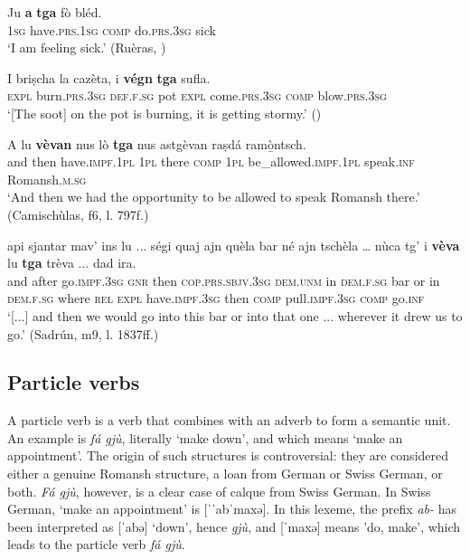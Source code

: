 \ea
\label{ex:vajtga1}
\gll  Ju \textbf{a} \textbf{tga} fò bléd.\\
\textsc{1sg} have.\textsc{prs.1sg} \textsc{comp} do.\textsc{prs.3sg} sick\\
\glt `I am feeling sick.' (Ruèras, )
\z

\ea
\label{ex:vegntga1}
\gll I briṣcha la cazèta, i \textbf{végn} \textbf{tga} sufla. \\
\textsc{expl} burn.\textsc{prs.3sg} \textsc{def.f.sg} pot \textsc{expl} come.\textsc{prs.3sg} \textsc{comp} blow.\textsc{prs.3sg} \\
\glt `[The soot] on the pot is burning, it is getting stormy.' ()
\z

\ea
\label{ex:vajtga2}
\gll    A lu \textbf{vèvan} nus lò \textbf{tga} nus astgèvan raṣdá ramò̱ntsch.\\
and then have.\textsc{impf.1pl} \textsc{1pl} there \textsc{comp} \textsc{1pl} be\_allowed.\textsc{impf.1pl} speak.\textsc{inf} Romansh.\textsc{m.sg} \\
\glt `And then we had the opportunity to be allowed to speak Romansh there.' (Camischùlas, f6, l. 797f.)
\z

\ea
\label{ex:vajtga3}
\gll  [...] api sjantar mav’ ins lu ... ségi quaj ajn quèla bar né ajn tschèla … nùca tg’ i \textbf{vèva} lu \textbf{tga} trèva ... dad ira.  \\
{} and after go.\textsc{impf.3sg} \textsc{gnr} then {} \textsc{cop.prs.sbjv.3sg} \textsc{dem.unm} in \textsc{dem.f.sg} bar or in \textsc{dem.f.sg} {} where \textsc{rel} \textsc{expl} have.\textsc{impf.3sg} then \textsc{comp} pull.\textsc{impf.3sg} {} \textsc{comp} go.\textsc{inf}\\
\glt `[...] and then we would go into this bar or into that one ... wherever it drew us to go.' (Sadrún, m9, l. 1837ff.)
\z

\subsection{Particle verbs}
A particle verb is a verb that combines with an adverb to form a semantic unit. An example is \textit{fá gjù}, literally `make down', and which means `make an appointment'. The origin of such structures is controversial: they are considered either a genuine Romansh structure, a loan from German or Swiss German, or both. \textit{Fá gjù}, however, is a clear case of calque from Swiss German. In Swiss German, `make an appointment' is [ˈˈabˈmaxə]. In this lexeme, the prefix \textit{ab-} has been interpreted as [ˈabə] `down', hence \textit{gjù}, and [ˈmaxə] means 'do, make', which leads to the particle verb \textit{fá gjù}.

